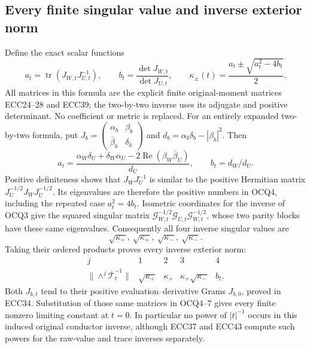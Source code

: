 \documentclass[11pt]{article}
\begin{document}
\subsection{Every finite singular value and inverse exterior norm}
Define the exact scalar functions
\[
 a_t=\operatorname{tr}(J_{W,t}J_{U,t}^{-1}),\qquad
 b_t=\frac{\det J_{W,t}}{\det J_{U,t}},\qquad
 \kappa_\pm(t)=\frac{a_t\pm\sqrt{a_t^2-4b_t}}2.
 \tag{OCQ4}
\]
All matrices in this formula are the explicit finite original-moment
matrices ECC24--28 and ECC39; the two-by-two inverse uses its adjugate
and positive determinant. No coefficient or metric is replaced.
For an entirely expanded two-by-two formula, put
$J_b=\left(\begin{smallmatrix}\alpha_b&\beta_b\\
 \bar\beta_b&\delta_b\end{smallmatrix}\right)$ and
$d_b=\alpha_b\delta_b-|\beta_b|^2$. Then
\[
 a_t=\frac{\alpha_W\delta_U+\delta_W\alpha_U
                -2\operatorname{Re}(\beta_W\bar\beta_U)}{d_U},
 \qquad b_t=d_W/d_U.
 \tag{OCQ5}
\]
Positive definiteness shows that $J_WJ_U^{-1}$ is similar to the
positive Hermitian matrix $J_U^{-1/2}J_WJ_U^{-1/2}$.
Its eigenvalues are therefore the positive numbers in OCQ4, including
the repeated case $a_t^2=4b_t$. Isometric coordinates for the inverse
of OCQ3 give the squared singular matrix
$\mathcal G_{W,t}^{-1/2}\mathcal G_{U,t}
 \mathcal G_{W,t}^{-1/2}$, whose two parity blocks have these same
eigenvalues. Consequently all four inverse singular values are
\[
 \sqrt{\kappa_+},\ \sqrt{\kappa_+},\
 \sqrt{\kappa_-},\ \sqrt{\kappa_-}.
 \tag{OCQ6}
\]
Taking their ordered products proves every inverse exterior norm:
\[
 \begin{array}{c|cccc}
 j&1&2&3&4\\\hline
 \|\wedge^j\overline{\mathcal T}_t^{-1}\|&
 \sqrt{\kappa_+}&\kappa_+&\kappa_+\sqrt{\kappa_-}&b_t.
 \end{array}\tag{OCQ7}
\]
Both $J_{b,t}$ tend to their positive evaluation--derivative Grams
$J_{b,0}$, proved in ECC34. Substitution of those same matrices in
OCQ4--7 gives every finite nonzero limiting constant at $t=0$.
In particular no power of $|t|^{-1}$ occurs in this induced original
conductor inverse, although ECC37 and ECC43 compute such powers for
the raw-value and trace inverses separately.
\end{document}
